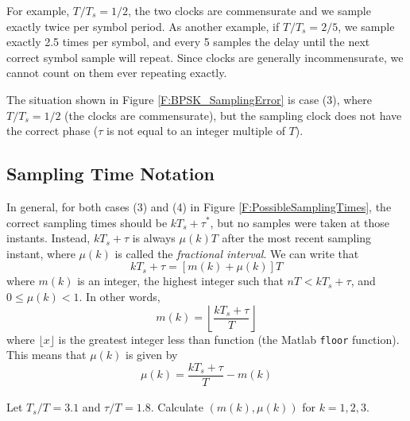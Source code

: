 
For example, $T_{}/T_{s} = 1/2$, the two clocks are commensurate
and we sample exactly twice per symbol period.  As another example,
if $T_{}/T_{s} = 2/5$, we sample exactly 2.5 times per symbol,
and every 5 samples the delay until the next correct symbol sample
will repeat.   Since clocks are generally incommensurate, we cannot
count on them ever repeating exactly.

The situation shown in Figure \ref{F:BPSK_SamplingError} is case
(3), where $T/T_{s} = 1/2$ (the clocks are commensurate), but
the sampling clock does not have the correct phase ($\tau$ is not
equal to an integer multiple of $T$).

\subsection{Sampling Time Notation}

In general, for both cases (3) and (4) in Figure
\ref{F:PossibleSamplingTimes}, the correct sampling times should be
$kT_{s} + \tau^*$, but no samples were taken at those instants.
Instead, $kT_{s} + \tau$ is always $\mu(k) T_{}$ after the most
recent sampling instant, where $\mu(k)$ is called the
\emph{fractional interval}. We can write that
\begin{equation}
  kT_{s} + \tau = [m(k) + \mu(k)] T_{}
\end{equation}
where $m(k)$ is an integer, the highest integer such that $nT_{} <
kT_{s} + \tau$, and $0 \le \mu(k) < 1$.  In other words,
\[
  m(k) = \left\lfloor \frac{kT_{s} + \tau}{T_{}} \right\rfloor
\]
where $\lfloor x \rfloor$ is the greatest integer less than function
(the Matlab \texttt{floor} function).  This means that $\mu(k)$ is
given by
\[
  \mu(k) =  \frac{kT_{s} + \tau}{T_{}} - m(k)
\]

  Let $T_{s}/T_{} = 3.1$ and
$\tau/T_{} = 1.8$.  Calculate $(m(k), \mu(k))$ for $k=1, 2, 3$.


